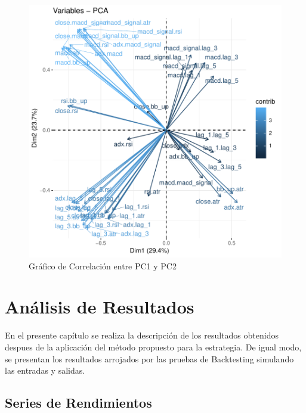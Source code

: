 \documentclass[a4paper,12pt]{Latex/Classes/PhDthesisPSnPDF}
\begin{document}
\begin{figure}[H]
\centering
\includegraphics{main-011}
\caption{Gráfico de Correlación entre PC1 y PC2}
\end{figure}


\chapter{Análisis de Resultados}

En el presente capítulo se realiza la descripción de los resultados obtenidos despues de la aplicación del método propuesto para la estrategia. De igual modo, se presentan los resultados arrojados por las pruebas de Backtesting simulando las entradas y salidas.

\section{Series de Rendimientos}
\end{document}
